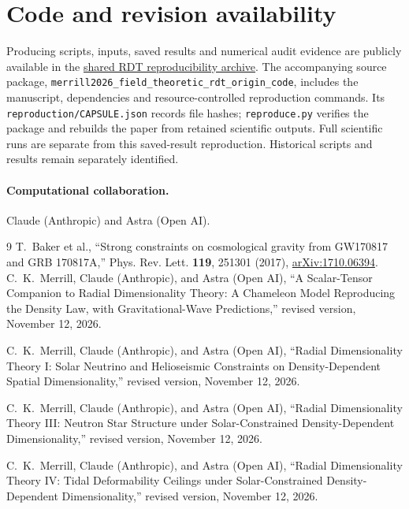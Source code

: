 \documentclass[11pt,a4paper]{article}
\begin{document}
\section*{Code and revision availability}
Producing scripts, inputs, saved results and numerical audit evidence are
publicly available in the \href{https://github.com/chrismerrill1974/solarcore_code/tree/main/reproduction}{shared RDT reproducibility archive}.
The accompanying source package, \nolinkurl{merrill2026_field_theoretic_rdt_origin_code}, includes the
manuscript, dependencies and resource-controlled reproduction commands.
Its \texttt{reproduction/CAPSULE.json} records file hashes;
\texttt{reproduce.py} verifies the package and rebuilds the paper from retained
scientific outputs. Full scientific runs are separate from this saved-result
reproduction. Historical scripts and results remain separately identified.

\paragraph{Computational collaboration.} Claude (Anthropic) and Astra (Open AI).

\begin{thebibliography}{9}
 T.~Baker et al., ``Strong constraints on cosmological gravity
from GW170817 and GRB 170817A,'' Phys. Rev. Lett. \textbf{119}, 251301 (2017),
\href{https://arxiv.org/abs/1710.06394}{arXiv:1710.06394}.
 C.~K.~Merrill, Claude (Anthropic), and Astra (Open AI),
``A Scalar-Tensor Companion to Radial Dimensionality Theory: A Chameleon Model Reproducing the Density Law, with Gravitational-Wave Predictions,''
revised version, November 12, 2026.

 C.~K.~Merrill, Claude (Anthropic), and Astra (Open AI),
``Radial Dimensionality Theory I: Solar Neutrino and Helioseismic Constraints on Density-Dependent Spatial Dimensionality,''
revised version, November 12, 2026.

 C.~K.~Merrill, Claude (Anthropic), and Astra (Open AI),
``Radial Dimensionality Theory III: Neutron Star Structure under Solar-Constrained Density-Dependent Dimensionality,''
revised version, November 12, 2026.

 C.~K.~Merrill, Claude (Anthropic), and Astra (Open AI),
``Radial Dimensionality Theory IV: Tidal Deformability Ceilings under Solar-Constrained Density-Dependent Dimensionality,''
revised version, November 12, 2026.

\end{thebibliography}
\end{document}
